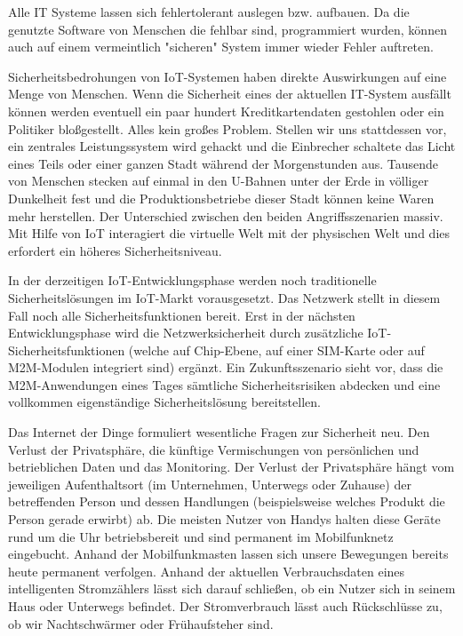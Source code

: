 Alle IT Systeme lassen sich fehlertolerant auslegen bzw. aufbauen. Da die genutzte Software von Menschen die fehlbar sind, programmiert wurden, können auch auf einem vermeintlich "sicheren" System immer wieder Fehler auftreten.

Sicherheitsbedrohungen von IoT-Systemen haben direkte Auswirkungen auf eine Menge von Menschen. Wenn die Sicherheit eines der aktuellen IT-System ausfällt können werden eventuell ein paar hundert Kreditkartendaten gestohlen oder ein Politiker bloßgestellt. Alles kein großes Problem. Stellen wir uns stattdessen vor, ein zentrales Leistungssystem wird gehackt und die Einbrecher schaltete das Licht eines Teils oder einer ganzen Stadt während der Morgenstunden aus. Tausende von Menschen stecken auf einmal in den U-Bahnen unter der Erde in völliger Dunkelheit fest und die Produktionsbetriebe dieser Stadt können keine Waren mehr herstellen. Der Unterschied zwischen den beiden Angriffsszenarien massiv. Mit Hilfe von IoT interagiert die virtuelle Welt mit der physischen Welt und dies erfordert ein höheres Sicherheitsniveau.

In der derzeitigen IoT-Entwicklungsphase werden noch traditionelle Sicherheitslösungen im IoT-Markt vorausgesetzt. Das Netzwerk stellt in diesem Fall noch alle Sicherheitsfunktionen bereit. Erst in der nächsten Entwicklungsphase wird die Netzwerksicherheit durch zusätzliche IoT-Sicherheitsfunktionen (welche auf Chip-Ebene, auf einer SIM-Karte oder auf M2M-Modulen integriert sind) ergänzt. Ein Zukunftsszenario sieht vor, dass die M2M-Anwendungen eines Tages sämtliche Sicherheitsrisiken abdecken und eine vollkommen eigenständige Sicherheitslösung bereitstellen.

Das Internet der Dinge formuliert wesentliche Fragen zur Sicherheit neu. Den Verlust der Privatsphäre, die künftige Vermischungen von persönlichen und betrieblichen Daten und das Monitoring. Der Verlust der Privatsphäre hängt vom jeweiligen Aufenthaltsort (im Unternehmen, Unterwegs oder Zuhause) der betreffenden Person und dessen Handlungen (beispielsweise welches Produkt die Person gerade erwirbt) ab. Die meisten Nutzer von Handys halten diese Geräte rund um die Uhr betriebsbereit und sind permanent im Mobilfunknetz eingebucht. Anhand der Mobilfunkmasten lassen sich unsere Bewegungen bereits heute permanent verfolgen. Anhand der aktuellen Verbrauchsdaten eines intelligenten Stromzählers lässt sich darauf schließen, ob ein Nutzer sich in seinem Haus oder Unterwegs befindet. Der Stromverbrauch lässt auch Rückschlüsse zu, ob wir Nachtschwärmer oder Frühaufsteher sind.

